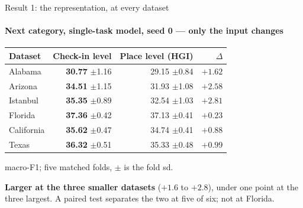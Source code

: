 \documentclass{beamer}
\begin{document}
\begin{frame}{Result 1: the representation, at every dataset}
    \framesubtitle{Next category, single-task model, seed 0 --- only the input changes}
    \begin{center}
        \small
        \setlength{\tabcolsep}{9pt}
        \begin{tabular}{@{}lrrr@{}}
            \toprule
            \textbf{Dataset} & \textbf{Check-in level} & \textbf{Place level (HGI)} & \textbf{$\Delta$} \\
            \midrule
            Alabama    & \textbf{30.77} $\pm$1.16 & 29.15 $\pm$0.84 & $+1.62$ \\
            Arizona    & \textbf{34.51} $\pm$1.15 & 31.93 $\pm$1.08 & $+2.58$ \\
            Istanbul   & \textbf{35.35} $\pm$0.89 & 32.54 $\pm$1.03 & $+2.81$ \\
            Florida    & \textbf{37.36} $\pm$0.42 & 37.13 $\pm$0.41 & $+0.23$ \\
            California & \textbf{35.62} $\pm$0.47 & 34.74 $\pm$0.41 & $+0.88$ \\
            Texas      & \textbf{36.32} $\pm$0.51 & 35.33 $\pm$0.48 & $+0.99$ \\
            \bottomrule
        \end{tabular}\par
        \smallskip
        {\footnotesize macro-F1; five matched folds, $\pm$ is the fold sd.\par}
    \end{center}

    {\footnotesize
    \textbf{Larger at the three smaller datasets} ($+1.6$ to $+2.8$), under one point at the three
    largest. A paired test separates the two at five of six; \alert{not at Florida}.\par}
\end{frame}
\end{document}
